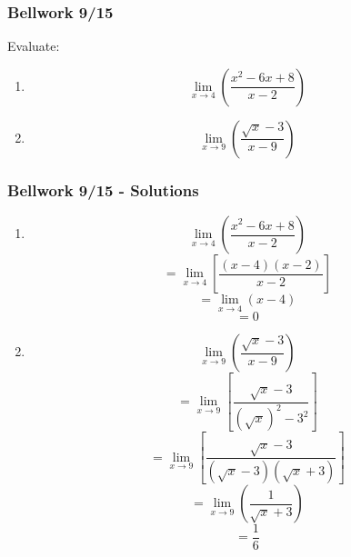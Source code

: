 \documentclass[12pt]{beamer}
\begin{document}
\begin{frame}
	\frametitle{Bellwork 9/15}
	\vspace*{\fill}
	\vspace*{\fill}
	\Large
	Evaluate:\\
	\large
	\initclock
	\begin{enumerate}
		\item \[\displaystyle\lim_{x\to4}\left(\frac{x^2-6x+8}{x-2}\right)\]
		\item \[\displaystyle\lim_{x\to9}\left(\frac{\sqrt{x}-3}{x-9}\right)\]
	\end{enumerate}
	\vspace*{\fill}
	\vspace*{\fill}
	\vspace*{\fill}
	\crono
\end{frame}
\begin{frame}
	\frametitle{Bellwork 9/15 - Solutions}
	\begin{multicols}{2}
		\begin{enumerate}\itemsep6ex
			\large
			\item{
			            \[\displaystyle\lim_{x\to4}\left(\frac{x^2-6x+8}{x-2}\right)\]
			            \[=\displaystyle\lim_{x\to4}\left[\frac{(x-4)(x-2)}{x-2}\right]\]
			            \[=\displaystyle\lim_{x\to4}(x-4)\]
			            \[=\boxed{0}\]
			      }
			\small
			\item{
			            \[\displaystyle\lim_{x\to9}\left(\frac{\sqrt{x}-3}{x-9}\right)\]
			            \[=\displaystyle\lim_{x\to9}\left[\frac{\sqrt{x}-3}{(\sqrt{x})^2-3^2}\right]\]
			            \[=\displaystyle\lim_{x\to9}\left[\frac{\sqrt{x}-3}{(\sqrt{x}-3)(\sqrt{x}+3)}\right]\] %
			            \[=\displaystyle\lim_{x\to9}\left(\frac{1}{\sqrt{x}+3}\right)\]
			            \[=\boxed{\frac{1}{6}}\]
			      }
		\end{enumerate}
	\end{multicols}
\end{frame}
\end{document}
